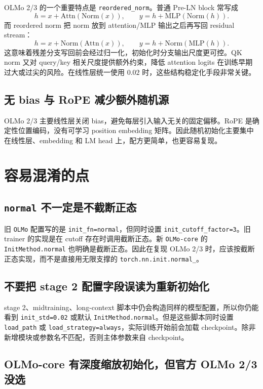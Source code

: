 \documentclass[UTF8,a4paper,11pt]{ctexart}
\begin{document}
OLMo 2/3 的一个重要特点是 \texttt{reordered\_norm}。普通 Pre-LN block 常写成
\[
  h=x+\mathrm{Attn}(\mathrm{Norm}(x)),
\qquad
  y=h+\mathrm{MLP}(\mathrm{Norm}(h)).
\]
而 reordered norm 把 norm 放到 attention/MLP 输出之后再写回 residual stream：
\[
  h=x+\mathrm{Norm}(\mathrm{Attn}(x)),
\qquad
  y=h+\mathrm{Norm}(\mathrm{MLP}(h)).
\]
这意味着残差分支写回前会经过归一化，初始化时分支输出尺度更可控。QK norm 又对 query/key 相关尺度提供额外约束，降低 attention logits 在训练早期过大或过尖的风险。在线性层统一使用 $0.02$ 时，这些结构稳定化手段非常关键。

\subsection{无 bias 与 RoPE 减少额外随机源}

OLMo 2/3 主要线性层关闭 bias，避免每层引入输入无关的固定偏移。RoPE 是确定性位置编码，没有可学习 position embedding 矩阵。因此随机初始化主要集中在线性层、embedding 和 LM head 上，配方更简单，也更容易复现。

\section{容易混淆的点}

\subsection{\texttt{normal} 不一定是不截断正态}

旧 \texttt{OLMo} 配置写的是 \texttt{init\_fn=normal}，但同时设置 \texttt{init\_cutoff\_factor=3}。旧 trainer 的实现是在 cutoff 存在时调用截断正态。新 \texttt{OLMo-core} 的 \texttt{InitMethod.normal} 也明确是截断正态。因此在复现 OLMo 2/3 时，应该按截断正态实现，而不是直接用无限支撑的 \texttt{torch.nn.init.normal\_}。

\subsection{不要把 stage 2 配置字段误读为重新初始化}

stage 2、midtraining、long-context 脚本中仍会构造同样的模型配置，所以你仍能看到 \texttt{init\_std=0.02} 或默认 \texttt{InitMethod.normal}。但是这些脚本同时设置 \texttt{load\_path} 或 \texttt{load\_strategy=always}，实际训练开始前会加载 checkpoint。除非新增模块或参数名不匹配，否则主体参数来自 checkpoint。

\subsection{OLMo-core 有深度缩放初始化，但官方 OLMo 2/3 没选}
\end{document}
